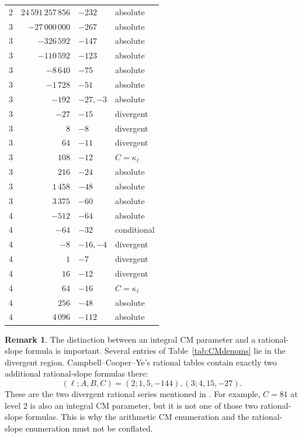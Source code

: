 \documentclass[11pt,a4paper]{amsart} %
\theoremstyle{definition}
\newtheorem{remark}[theorem]{Remark}
\begin{document}
\begin{longtable}{@{}c r l l@{}}
2 & \(24\,591\,257\,856\) & \(-232\) & absolute \\
3 & \(-27\,000\,000\) & \(-267\) & absolute \\
3 & \(-326\,592\) & \(-147\) & absolute \\
3 & \(-110\,592\) & \(-123\) & absolute \\
3 & \(-8\,640\) & \(-75\) & absolute \\
3 & \(-1\,728\) & \(-51\) & absolute \\
3 & \(-192\) & \(-27, -3\) & absolute \\
3 & \(-27\) & \(-15\) & divergent \\
3 & \(8\) & \(-8\) & divergent \\
3 & \(64\) & \(-11\) & divergent \\
3 & \(108\) & \(-12\) & \(C=\kappa_\ell\) \\
3 & \(216\) & \(-24\) & absolute \\
3 & \(1\,458\) & \(-48\) & absolute \\
3 & \(3\,375\) & \(-60\) & absolute \\
4 & \(-512\) & \(-64\) & absolute \\
4 & \(-64\) & \(-32\) & conditional \\
4 & \(-8\) & \(-16, -4\) & divergent \\
4 & \(1\) & \(-7\) & divergent \\
4 & \(16\) & \(-12\) & divergent \\
4 & \(64\) & \(-16\) & \(C=\kappa_\ell\) \\
4 & \(256\) & \(-48\) & absolute \\
4 & \(4\,096\) & \(-112\) & absolute \\
\bottomrule
\end{longtable}

\begin{remark}\label{rem:two-divergent}
The distinction between an integral CM parameter and a rational-slope
formula is important. Several entries of Table~\ref{tab:CMdenoms} lie in the
divergent region. Campbell--Cooper--Ye's rational tables contain exactly two
additional rational-slope formulas there:
\[
(\ell;A,B,C)=(2;1,5,-144),%
(3;4,15,-27).
\tag{3}
\]
These are the two divergent rational series mentioned in
\cite[Sec.~4.4]{CCY}. For example, \(C=81\) at level \(2\) is also an integral
CM parameter, but it is not one of those two rational-slope formulas. This is
why the arithmetic CM enumeration and the rational-slope enumeration must not
be conflated.
\end{remark}
\end{document}
